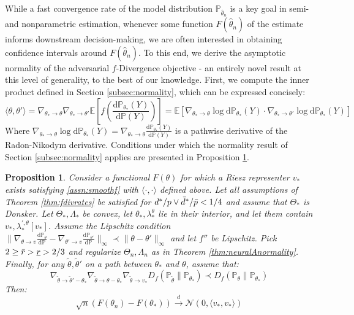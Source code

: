 \documentclass[12pt]{article}
\def\D{\mathrm{d}}
\theoremstyle{myplain}
\newtheorem{proposition}{Proposition}[section]
\theoremstyle{definition}
\theoremstyle{definition}
\theoremstyle{remark}
\numberwithin{equation}{section}
\begin{document}
While a fast convergence rate of the model distribution $\mathbb{P}_{\widehat\theta_n}$ is a key goal in semi- and nonparametric estimation, whenever some function $F(\widehat\theta_n)$ of the estimate informs downstream decision-making, we are often interested in obtaining confidence intervals around $F(\widehat\theta_n)$. To this end, we derive the asymptotic normality of the adversarial $f$-Divergence objective - an entirely novel result at this level of generality, to the best of our knowledge. First, we compute the inner product defined in Section \ref{subsec:normality}, which can be expressed concisely:
$$
    \langle \theta, \theta' \rangle = \nabla_{\theta_*\to\theta}\nabla_{\theta_*\to\theta'} \mathbb{E}\left[f\left(\frac{\D\mathbb{P}_{\theta_*}(Y)}{\D\mathbb{P}(Y)}\right)\right] = \mathbb{E}\left[\nabla_{\theta_*\to\theta}\log \D\mathbb{P}_{\theta_*}(Y) \cdot \nabla_{\theta_*\to\theta'}\log \D\mathbb{P}_{\theta_*}(Y)\right]
$$
Where $\nabla_{\theta_*\to\theta}\log \D\mathbb{P}_{\theta_*}(Y)=\nabla_{\theta_*\to\theta}\frac{\D\mathbb{P}_{\theta_*}(Y)}{\D\mathbb{P}(Y)}$ is a pathwise derivative of the Radon-Nikodym derivative. Conditions under which the normality result of Section \ref{subsec:normality} applies are presented in Proposition \ref{thm:fdivnormality}.
\begin{proposition}\label{thm:fdivnormality}
Consider a functional $F(\theta)$ for which a Riesz representer $v_*$ exists satisfying \ref{assn:smoothf} with $\langle\cdot,\cdot\rangle$ defined above. Let all assumptions of Theorem \ref{thm:fdivrates} be satisfied for $d^*/p \vee \Bar d^*/\Bar p < 1/4$ and assume that $\mathcal{\Theta}_*$ is Donsker. Let $\Theta_*, \Lambda_*$ be convex, let $\theta_*, \lambda_*^\theta$ lie in their interior, and let them contain $v_*, \lambda^{\prime,\theta}_*[v_*]$. Assume the Lipschitz condition $\|\nabla_{\theta\to v}\frac{\D\mathbb{P}_\theta}{\D\mathbb{P}}-\nabla_{\theta'\to v}\frac{\D\mathbb{P}_{\theta'}}{\D\mathbb{P}}\|_\infty\prec \|\theta-\theta'\|_\infty$ and let $f''$ be Lipschitz. Pick $2\geq\Bar r >\underline{r}>2/3$ and regularize $\Theta_n, \Lambda_n$ as in Theorem \ref{thm:neuralAnormality}. Finally, for any $\widetilde\theta, \widetilde\theta'$ on a path between $\theta_*$ and $\theta$, assume that:
$$\nabla_{\widetilde\theta \to \widetilde\theta'-\theta_*}\nabla_{\widetilde\theta \to \theta-\theta_*}\nabla_{\widetilde\theta \to v_*} D_f(\mathbb{P}_{\widetilde\theta}\|\mathbb{P}_{\theta_*})\prec D_f(\mathbb{P}_\theta\|\mathbb{P}_{\theta_*})$$
Then:
\begin{equation}
    \sqrt{n}(F(\theta_n) - F(\theta_*)) \overset{d}{\rightarrow}\mathcal{N}(0, \langle v_*, v_*\rangle)
\end{equation}
\end{proposition}
\end{document}
